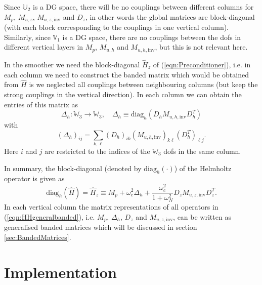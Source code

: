 \documentclass[10pt]{article}
\newcommand{\Uspace}{\mathbb{U}}
\newcommand{\Vspace}{\mathbb{V}}
\newcommand{\Wspace}{\mathbb{W}}
\begin{document}
Since $\Uspace_2$ is a DG space, there will be no couplings between different columns for $M_p$, $M_{u,z}$, $M_{u,z,\text{inv}}$ and $D_z$, in other words the global matrices are block-diagonal (with each block corresponding to the couplings in one vertical column). Similarly, since $\Vspace_1$ is a DG space, there are no couplings between the dofs in different vertical layers in $M_{p}$, $M_{u,h}$ and $M_{u,h,\text{inv}}$, but this is not relevant here.

In the smoother we need the block-diagonal $\hat{H}_z$ of (\ref{eqn:Preconditioner}), i.e. in each column we need to construct the banded matrix which would be obtained from $\hat{H}$ is we neglected all couplings between neighbouring columns (but keep the strong couplings in the vertical direction). In each column we can obtain the entries of this matrix as
\begin{equation}
  \Delta_h:\Wspace_3 \rightarrow\Wspace_3,\quad \Delta_h \equiv \text{diag}_{h}\left(D_h M_{u,h,\text{inv}} D_h^T\right)
\end{equation}
with
\begin{equation}
  \left(\Delta_h\right)_{ij}
  = \sum_{k,\ell} 
\left(D_h\right)_{ik} 
\left(M_{u,h,\text{inv}}\right)_{k\ell}
\left(D^T_h\right)_{\ell j}.\label{eqn:Deltah}
\end{equation}
Here $i$ and $j$ are restricted to the indices of the $\Wspace_3$ dofs in the same column.

In summary, the block-diagonal (denoted by $\text{diag}_h(\cdot)$) of the Helmholtz operator is given as
\begin{equation}
  \text{diag}_h(\hat{H}) = \hat{H}_z \equiv M_{p} + \omega_c^2\Delta_h+\frac{\omega_c^2}{1+\omega_N^2} D_z M_{u,z,\text{inv}} D_z^T
  \label{eqn:HHgeneralbanded}.
\end{equation}
In each vertical column the matrix representations of all operators in (\ref{eqn:HHgeneralbanded}), i.e. $M_p$, $\Delta_h$, $D_z$ and $M_{u,z,\text{inv}}$, can be written as generalised banded matrices which will be discussed in section \ref{sec:BandedMatrices}.
\section{Implementation}
\end{document}
